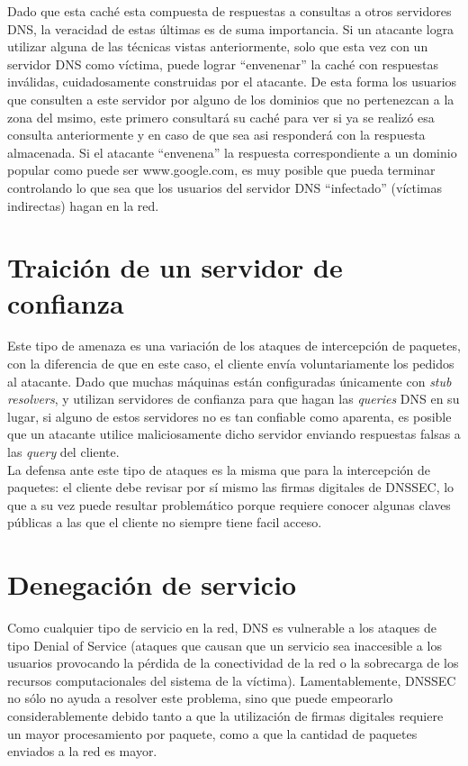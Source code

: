 Dado que esta cach\'e esta compuesta de respuestas a consultas a otros
servidores DNS, la veracidad de estas \'ultimas es de suma importancia.
Si un atacante logra utilizar alguna de las t\'ecnicas vistas anteriormente,
solo que esta vez con un servidor DNS como v\'ictima, puede lograr
``envenenar'' la cach\'e con respuestas inv\'alidas, cuidadosamente construidas
por el atacante. De esta forma los usuarios que consulten a este servidor por
alguno de los dominios que no pertenezcan a la zona del msimo,
este primero consultar\'a su cach\'e para ver si ya se realiz\'o esa consulta
anteriormente y en caso de que sea asi responder\'a con la respuesta
almacenada. Si el atacante ``envenena'' la respuesta correspondiente a un
dominio popular como puede ser www.google.com, es muy posible que pueda
terminar controlando lo que sea que los usuarios del servidor DNS
``infectado'' (v\'ictimas indirectas) hagan en la red.

\section{Traici\'on de un servidor de confianza}
Este tipo de amenaza es una variaci\'on de los ataques de intercepci\'on de paquetes, con la diferencia de que en este caso, el cliente env\'ia voluntariamente los pedidos al atacante. Dado que muchas m\'aquinas est\'an configuradas \'unicamente con \textit{stub resolvers}, y utilizan servidores de confianza para que hagan las \textit{queries} DNS en su lugar, si alguno de estos servidores no es tan confiable como aparenta, es posible que un atacante utilice maliciosamente dicho servidor enviando respuestas falsas a las \textit{query} del cliente.\\
La defensa ante este tipo de ataques es la misma que para la intercepci\'on de paquetes: el cliente debe revisar por s\'i mismo las firmas digitales de DNSSEC, lo que a su vez puede resultar problem\'atico porque requiere conocer algunas claves p\'ublicas a las que el cliente no siempre tiene facil acceso.


\section{Denegaci\'on de servicio}
Como cualquier tipo de servicio en la red, DNS es vulnerable a los ataques de tipo Denial of Service (ataques que causan que un servicio sea inaccesible a los usuarios provocando la p\'erdida de la conectividad de la red o la sobrecarga de los recursos computacionales del sistema de la v\'ictima\cite{dos06}). Lamentablemente, DNSSEC no s\'olo no ayuda a resolver este problema, sino que puede empeorarlo considerablemente debido tanto a que la utilizaci\'on de firmas digitales requiere un mayor procesamiento por paquete, como a que la cantidad de paquetes enviados a la red es mayor.


